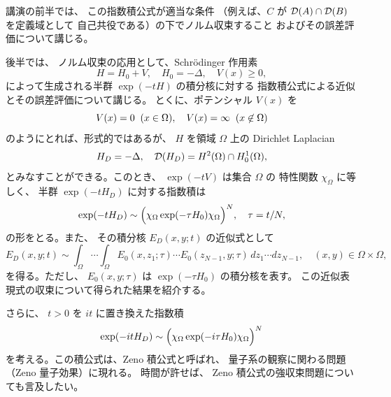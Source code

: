 \documentclass[uplatex,dvipdfmx]{jlreq}
\newcommand{\squad}{\hspace{2.8pt}}
\renewcommand{\t}{\tau}
\begin{document}
講演の前半では、
この指数積公式が適当な条件
（例えば、$C$ が ${\cal D}(A)\cap{\cal D}(B)$ を定義域として
自己共役である）の下でノルム収束すること
およびその誤差評価について講じる。

後半では、
ノルム収束の応用として、Schr\"odinger 作用素
\[
H = H_0 + V,
\quad
H_0 = -\Delta,
\quad
V(x) \geq 0,
\]
によって生成される半群 $\exp(-tH)$ の積分核に対する
指数積公式による近似とその誤差評価について講じる。
とくに、ポテンシャル $V(x)$ を
\[
V(x) = 0
\squad\squad(x \in \Omega),
\quad V(x) = \infty
\squad\squad(x \not\in \Omega)
\]
のようにとれば、形式的ではあるが、
$H$ を領域 $\Omega$ 上の Dirichlet Laplacian
\[
H_D = -\Delta,
\quad
{\cal D}(H_D) = H^2(\Omega)\cap H_0^1(\Omega),
\]
とみなすことができる。このとき、
$\exp(-tV)$ は集合 $\Omega$ の
特性関数 $\chi_{\Omega}$ に等しく、
半群 $\exp(-tH_D)$ に対する指数積は
\[
\exp(-tH_D) \sim
\Bigl(\chi_{\Omega}\exp(-\t H_0)\chi_{\Omega}\Bigr)^N,
\quad \t = t/N,
\]
の形をとる。また、
その積分核 $E_D(x,y;t)$ の近似式として
\[
E_D(x,y;t) \sim
\int_{\Omega}\cdots\int_{\Omega}
E_0(x,z_1;\t)\cdots E_0(z_{N-1},y;\t)\,dz_1\cdots dz_{N-1},
\quad (x,y) \in \Omega\times\Omega,
\]
を得る。ただし、
$E_0(x,y;\t)$ は $\exp(-\t H_0)$ の積分核を表す。
この近似表現式の収束について得られた結果を紹介する。

さらに、
$t > 0$ を $it$ に置き換えた指数積
\[
\exp(-itH_D) \sim
\Bigl(\chi_{\Omega}\exp(-i\t H_0)\chi_{\Omega}\Bigr)^N
\]
を考える。この積公式は、Zeno 積公式と呼ばれ、
量子系の観察に関わる問題（Zeno 量子効果）に現れる。
時間が許せば、
Zeno 積公式の強収束問題についても言及したい。
\end{document}
